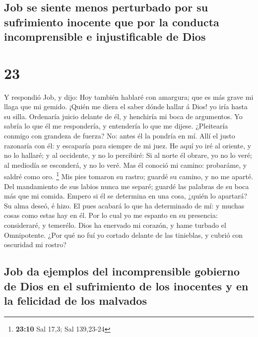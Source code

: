 \hypertarget{job-se-siente-menos-perturbado-por-su-sufrimiento-inocente-que-por-la-conducta-incomprensible-e-injustificable-de-dios}{%
\subsection{Job se siente menos perturbado por su sufrimiento inocente
que por la conducta incomprensible e injustificable de
Dios}\label{job-se-siente-menos-perturbado-por-su-sufrimiento-inocente-que-por-la-conducta-incomprensible-e-injustificable-de-dios}}

\hypertarget{section-22}{%
\section{23}\label{section-22}}

 Y respondió Job, y dijo:  Hoy también
hablaré con amargura; que es más grave mi llaga que mi gemido.
 ¡Quién me diera el saber dónde hallar á Dios! yo iría
hasta su silla.  Ordenaría juicio delante de él, y
henchiría mi boca de argumentos.  Yo sabría lo que él me
respondería, y entendería lo que me dijese.  ¿Pleitearía
conmigo con grandeza de fuerza? No: antes él la pondría en mí.
 Allí el justo razonaría con él: y escaparía para siempre
de mi juez.  He aquí yo iré al oriente, y no lo hallaré; y
al occidente, y no lo percibiré:  Si al norte él obrare,
yo no lo veré; al mediodía se esconderá, y no lo veré. 
Mas él conoció mi camino: probaráme, y saldré como oro. \footnote{\textbf{23:10}
  Sal 17,3; Sal 139,23-24}  Mis pies tomaron su rastro;
guardé su camino, y no me aparté.  Del mandamiento de sus
labios nunca me separé; guardé las palabras de su boca más que mi
comida.  Empero si él se determina en una cosa, ¿quién lo
apartará? Su alma deseó, é hizo.  El pues acabará lo que
ha determinado de mí: y muchas cosas como estas hay en él.
 Por lo cual yo me espanto en su presencia: consideraré,
y temerélo.  Dios ha enervado mi corazón, y hame turbado
el Omnipotente.  ¿Por qué no fuí yo cortado delante de
las tinieblas, y cubrió con oscuridad mi rostro?

\hypertarget{job-da-ejemplos-del-incomprensible-gobierno-de-dios-en-el-sufrimiento-de-los-inocentes-y-en-la-felicidad-de-los-malvados}{%
\subsection{Job da ejemplos del incomprensible gobierno de Dios en el
sufrimiento de los inocentes y en la felicidad de los
malvados}\label{job-da-ejemplos-del-incomprensible-gobierno-de-dios-en-el-sufrimiento-de-los-inocentes-y-en-la-felicidad-de-los-malvados}}

